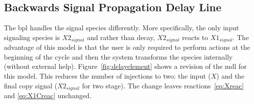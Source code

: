 \subsection{Backwards Signal Propagation Delay Line}
The \acrfull{bpl} handles the signal species differently. More specifically, the only input signaling species is $X2_{signal}$ and rather than decay, $X2_{signal}$ reacts to $X1_{signal}$. The advantage of this model is that the user is only required to perform actions at the beginning of the cycle and then the system transforms the species internally (without external help). Figure~\ref{fig:delayelement} shows a revision of the \gls{mdl} for this model. This reduces the number of injections to two: the input ($X$) and the final copy signal ($X2_{signal}$ for two stage). The change leaves reactions~\ref{eq:Xreac} and \ref{eq:X1Creac} unchanged.


